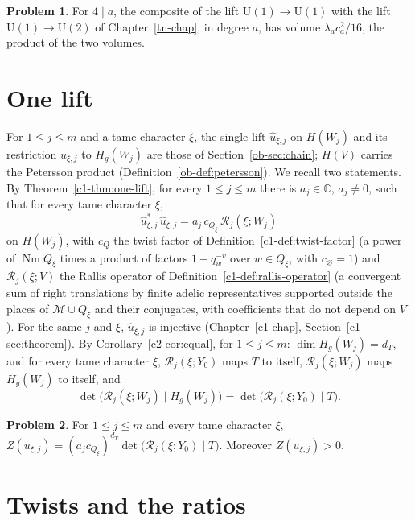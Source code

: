 \documentclass[reqno]{amsart}
\newcounter{chap}
\theoremstyle{definition}
\newtheorem{problem}{Problem}[section]
\theoremstyle{plain}
\newcommand{\C}{\mathbb C}
\newcommand{\Nm}{\operatorname{Nm}}
\newcommand{\Rc}{\mathcal R}
\begin{document}
\begin{problem}\label{pr:smallest}
For \(4 \mid a\), the composite of the lift \(\mathrm U(1) \to \mathrm U(1)\) with the lift \(\mathrm U(1) \to \mathrm U(2)\) of Chapter~\ref{tn-chap}, in degree \(a\), has volume \(\lambda_a c_a^2/16\), the product of the two volumes.
\end{problem}

\section{One lift}\label{sec:one-lift}

For \(1 \le j \le m\) and a tame character \(\xi\), the single lift \(\hat u_{\xi,j}\) on \(H(W_j)\) and its restriction \(u_{\xi,j}\) to \(H_g(W_j)\) are those of Section~\ref{ob-sec:chain}; \(H(V)\) carries the Petersson product (Definition~\ref{ob-def:petersson}).  We recall two statements.  By Theorem~\ref{c1-thm:one-lift}, for every \(1 \le j \le m\) there is \(a_j \in \C\), \(a_j \ne 0\), such that for every tame character \(\xi\),
\[
  \hat u_{\xi,j}^*\, \hat u_{\xi,j} = a_j\, c_{Q_\xi}\, \Rc_j(\xi; W_j)
\]
on \(H(W_j)\), with \(c_Q\) the twist factor of Definition~\ref{c1-def:twist-factor} (a power of \(\Nm Q_\xi\) times a product of factors \(1 - q_w^{-v}\) over \(w \in Q_\xi\), with \(c_\varnothing = 1\)) and \(\Rc_j(\xi; V)\) the Rallis operator of Definition~\ref{c1-def:rallis-operator} (a convergent sum of right translations by finite adelic representatives supported outside the places of \(\mathcal M \cup Q_\xi\) and their conjugates, with coefficients that do not depend on \(V\)).  For the same \(j\) and \(\xi\), \(\hat u_{\xi,j}\) is injective (Chapter~\ref{c1-chap}, Section~\ref{c1-sec:theorem}).  By Corollary~\ref{c2-cor:equal}, for \(1 \le j \le m\): \(\dim H_g(W_j) = d_T\), and for every tame character \(\xi\), \(\Rc_j(\xi; Y_0)\) maps \(T\) to itself, \(\Rc_j(\xi; W_j)\) maps \(H_g(W_j)\) to itself, and
\[
  \det\bigl(\Rc_j(\xi; W_j) \mid H_g(W_j)\bigr) = \det\bigl(\Rc_j(\xi; Y_0) \mid T\bigr) .
\]

\begin{problem}\label{pr:one-lift}
For \(1 \le j \le m\) and every tame character \(\xi\), \(Z(u_{\xi,j}) = (a_j c_{Q_\xi})^{d_T} \det\bigl(\Rc_j(\xi; Y_0) \mid T\bigr)\).  Moreover \(Z(u_{\xi,j}) > 0\).
\end{problem}

\section{Twists and the ratios}\label{sec:twists}
\end{document}
